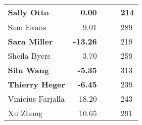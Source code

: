 \begin{longtable}{|p{5cm}|r|p{9cm}|p{6cm}|l|}
   \hline
Sally Otto & 0.00 &  &  & 214 \\ 
   \hline
Sam Evans & 9.01 &  &  & 289 \\ 
   \hline
\textbf{Sara Miller} & \textbf{-13.26} &  &  & 219 \\ 
   \hline
Sheila Byers & 3.70 &  &  & 259 \\ 
   \hline
\textbf{Silu Wang} & \textbf{-5.35} &  &  & 313 \\ 
   \hline
\textbf{Thierry Heger} & \textbf{-6.45} &  &  & 239 \\ 
   \hline
Vinicius Farjalla & 18.20 &  &  & 243 \\ 
   \hline
Xu Zhong & 10.65 &  &  & 291 \\ 
   \hline
\hline
\end{longtable}
